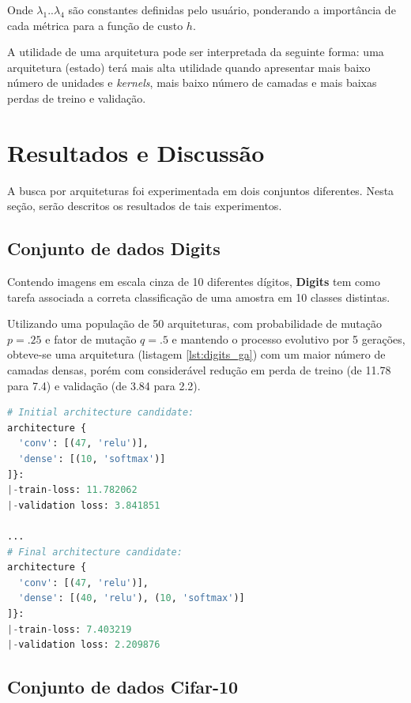 \documentclass[twoside,conference,a4paper,12px]{IEEEtran}
\begin{document}
Onde $\lambda_1 .. \lambda_4$ são constantes definidas pelo usuário, ponderando a importância de cada métrica para a função de custo $h$.

A utilidade de uma arquitetura pode ser interpretada da seguinte forma: uma arquitetura (estado) terá mais alta utilidade quando apresentar mais baixo número de unidades e \textit{kernels}, mais baixo número de camadas e mais baixas perdas de treino e validação.


\section{Resultados e Discussão}
\label{sec:resultados}

A busca por arquiteturas foi experimentada em dois conjuntos diferentes. Nesta seção, serão descritos os resultados de tais experimentos.

\subsection{Conjunto de dados \textbf{Digits}}

Contendo imagens em escala cinza de 10 diferentes dígitos, \textbf{Digits} tem como tarefa associada a correta classificação de uma amostra em 10 classes distintas.

Utilizando uma população de 50 arquiteturas, com probabilidade de mutação $p = .25$ e fator de mutação $q = .5$ e mantendo o processo evolutivo por 5 gerações, obteve-se uma arquitetura (listagem \ref{lst:digits_ga}) com um maior número de camadas densas, porém com considerável redução em perda de treino (de 11.78 para 7.4) e validação (de 3.84 para 2.2).

\begin{lstlisting}[language=Python, caption={Resultado da busca por algoritmo genético sobre o conjunto \textbf{Digits}.}, label={lst:digits_ga}]
# Initial architecture candidate:
architecture {
  'conv': [(47, 'relu')],
  'dense': [(10, 'softmax')]
]}:
|-train-loss: 11.782062
|-validation loss: 3.841851

...
# Final architecture candidate:
architecture {
  'conv': [(47, 'relu')],
  'dense': [(40, 'relu'), (10, 'softmax')]
]}:
|-train-loss: 7.403219
|-validation loss: 2.209876
\end{lstlisting}

\subsection{Conjunto de dados \textbf{Cifar-10}}
\end{document}
